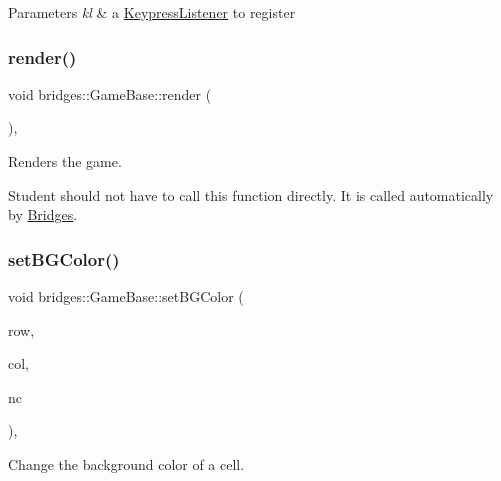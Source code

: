 \begin{DoxyParams}{Parameters}
{\em kl} & a \hyperlink{classbridges_1_1_keypress_listener}{Keypress\+Listener} to register \\
\hline
\end{DoxyParams}
\mbox{\label{classbridges_1_1_game_base_a7b05208b74523a3add8502fdc7659b15}} 
\subsubsection{\texorpdfstring{render()}{render()}}
{\footnotesize\ttfamily void bridges\+::\+Game\+Base\+::render (\begin{DoxyParamCaption}{ }\end{DoxyParamCaption})\hspace{0.3cm}{\ttfamily [inline]}, {\ttfamily [protected]}}



Renders the game. 

Student should not have to call this function directly. It is called automatically by \hyperlink{classbridges_1_1_bridges}{Bridges}. \mbox{\label{classbridges_1_1_game_base_a5d26e92863c37054acfd216878d741a5}} 
\subsubsection{\texorpdfstring{set\+B\+G\+Color()}{setBGColor()}}
{\footnotesize\ttfamily void bridges\+::\+Game\+Base\+::set\+B\+G\+Color (\begin{DoxyParamCaption}\item[{int}]{row,  }\item[{int}]{col,  }\item[{\hyperlink{namespacebridges_ad811207d8898a7fd6b72a74725e68357}{Named\+Color}}]{nc }\end{DoxyParamCaption})\hspace{0.3cm}{\ttfamily [inline]}, {\ttfamily [protected]}}



Change the background color of a cell. 


